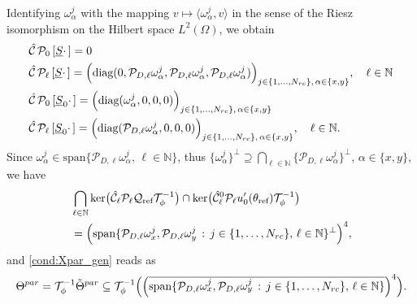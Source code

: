 \documentclass[12pt]{article}
\newcommand\Proj{\mathcal{P}}
\newcommand\ellnew{\ell}
\newcommand\coilsens{\omega}
\newcommand\hrefprime{\mathcal{Q}_{\text{ref}}}
\newcommand\Ncoil{N_{rc}}
\begin{document}
Identifying $\coilsens_\alpha^j$ with the mapping $v\mapsto \langle \coilsens_\alpha^j,v\rangle$ in the sense of the Riesz isomorphism on the Hilbert space $L^2(\Omega)$,
we obtain
\[
\begin{aligned}
&\hat{\mathcal{C}}\,\Proj_0\,[\underline{S} \cdot\,]
=0\\
&\hat{\mathcal{C}}\,\Proj_\ell\,[\underline{S} \cdot\,]
=\Bigl(\text{diag}(0,\Proj_{D,\ell}\coilsens_\alpha^j,\Proj_{D,\ell}\coilsens_\alpha^j,\Proj_{D,\ell}\coilsens_\alpha^j)\Bigr)_{j\in\{1,\ldots,\Ncoil\}, \, \alpha\in\{x,y\}}, 
\quad \ell\in\mathbb{N}\\
&\hat{\mathcal{C}}\,\Proj_0\,[\underline{S}_0 \cdot\,]
=\Bigl(\text{diag}(\coilsens_\alpha^j,0,0,0)\Bigr)_{j\in\{1,\ldots,\Ncoil\}, \, \alpha\in\{x,y\}}\\
&\hat{\mathcal{C}}\,\Proj_\ell\,[\underline{S}_0 \cdot\,]
=\Bigl(\text{diag}(\Proj_{D,\ell}\coilsens_\alpha^j,0,0,0)\Bigr)_{j\in\{1,\ldots,\Ncoil\}, \, \alpha\in\{x,y\}}, 
\quad \ell\in\mathbb{N}.
\end{aligned}
\]
Since $\coilsens_\alpha^j\in\text{span}\{\Proj_{D,\ell}\coilsens_\alpha^j,\,\ell\in\mathbb{N}\}$, thus 
$\{\coilsens_\alpha^j\}^\bot\supseteq
\bigcap_{\ell\in\mathbb{N}}\{\Proj_{D,\ell}\coilsens_\alpha^j\}^\bot$, $\alpha\in\{x,y\}$,
we have 
\[
\begin{aligned}
&\bigcap_{\ell\in\mathbb{N}} 
\text{ker}\bigl(\hat{\mathcal{C}}_\ellnew \Proj_\ell \hrefprime\mathcal{T}_\phi^{-1}\bigr)\cap 
\text{ker}\bigl(\hat{\mathcal{C}}^0_\ellnew \Proj_\ell u_0'(\theta_{\text{ref}})\mathcal{T}_\phi^{-1}\bigr)\\
&=\Bigl(\text{span}\{\Proj_{D,\ell}\coilsens_x^j,\Proj_{D,\ell}\coilsens_y^j\,:\, j\in\{1,\ldots,\Ncoil\},\,\ell\in\mathbb{N}\}^\bot\Bigr)^4,
\end{aligned}
\]
and \eqref{cond:Xpar_gen} reads as 
\[
\Theta^{par}=\mathcal{T}_\phi^{-1}\tilde{\Theta}^{par}
\subseteq \mathcal{T}_\phi^{-1}\Bigl(\Bigl(\overline{\text{span}\{\Proj_{D,\ell}\coilsens_x^j,\Proj_{D,\ell}\coilsens_y^j\,:\, j\in\{1,\ldots,\Ncoil\},\,\ell\in\mathbb{N}\}}\Bigr)^4\Bigr).
\]
\end{document}
